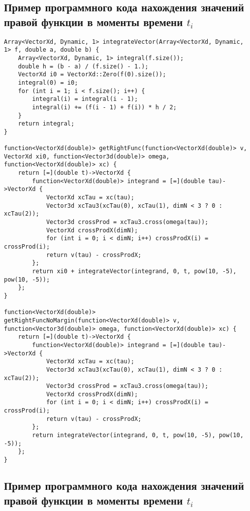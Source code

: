 \documentclass[12pt,a4paper]{article}
\begin{document}
\subsection{Пример программного кода нахождения значений правой функции в моменты времени $t_i$}
\label{code:rf}
\begin{lstlisting}
Array<VectorXd, Dynamic, 1> integrateVector(Array<VectorXd, Dynamic, 1> f, double a, double b) {
    Array<VectorXd, Dynamic, 1> integral(f.size());
    double h = (b - a) / (f.size() - 1.);
    VectorXd i0 = VectorXd::Zero(f(0).size());
    integral(0) = i0;
    for (int i = 1; i < f.size(); i++) {
        integral(i) = integral(i - 1);
        integral(i) += (f(i - 1) + f(i)) * h / 2;
    }
    return integral;
}

function<VectorXd(double)> getRightFunc(function<VectorXd(double)> v, VectorXd xi0, function<Vector3d(double)> omega, function<VectorXd(double)> xc) {
    return [=](double t)->VectorXd {
        function<VectorXd(double)> integrand = [=](double tau)->VectorXd {
            VectorXd xcTau = xc(tau);
            Vector3d xcTau3(xcTau(0), xcTau(1), dimN < 3 ? 0 : xcTau(2));
            Vector3d crossProd = xcTau3.cross(omega(tau));
            VectorXd crossProdX(dimN);
            for (int i = 0; i < dimN; i++) crossProdX(i) = crossProd(i);
            return v(tau) - crossProdX;
        };
        return xi0 + integrateVector(integrand, 0, t, pow(10, -5), pow(10, -5));
    };
}

function<VectorXd(double)> getRightFuncNoMargin(function<VectorXd(double)> v, function<Vector3d(double)> omega, function<VectorXd(double)> xc) {
    return [=](double t)->VectorXd {
        function<VectorXd(double)> integrand = [=](double tau)->VectorXd {
            VectorXd xcTau = xc(tau);
            Vector3d xcTau3(xcTau(0), xcTau(1), dimN < 3 ? 0 : xcTau(2));
            Vector3d crossProd = xcTau3.cross(omega(tau));
            VectorXd crossProdX(dimN);
            for (int i = 0; i < dimN; i++) crossProdX(i) = crossProd(i);
            return v(tau) - crossProdX;
        };
        return integrateVector(integrand, 0, t, pow(10, -5), pow(10, -5));
    };
}
\end{lstlisting}

\subsection{Пример программного кода нахождения значений правой функции в моменты времени $t_i$}
\label{code:}
\begin{lstlisting}

\end{lstlisting}
\end{document}

